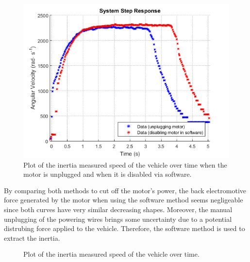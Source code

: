 \begin{figure}[H]
  \centering
  \includegraphics[scale=0.7]{figures/inertiaTestPowerCutOrDisable.png}
  \caption{Plot of the inertia measured speed of the vehicle over time when the motor is unplugged and when it is disabled via software.}
  \label{inertiaTestPowerCutOrDisable}
\end{figure}
%
By comparing both methods to cut off the motor's power, the back electromotive force generated by the motor when using the software method seems negligeable since both curves have very similar decreasing shapes. Moreover, the manual unplugging of the powering wires brings some uncertainty due to a potential distrubing force applied to the vehicle.
Therefore, the software method is used to extract the inertia.

\begin{figure}[H]
  \centering
  \caption{Plot of the inertia measured speed of the vehicle over time.}
  \label{intertiaTestPlot}
\end{figure}